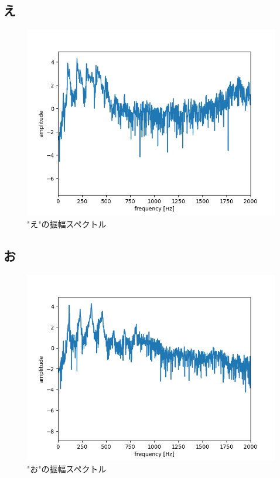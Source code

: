 \documentclass[a4paper,11pt]{jsarticle}
\begin{document}
\subsection*{え}
\begin{figure}[H]
  \centering
  \includegraphics[scale=0.5]{../ex2/img/plot-spectrum-2000_e.png}
  \caption{"え"の振幅スペクトル}
  \label{spectrum_e}
\end{figure}

\subsection*{お}
\begin{figure}[H]
  \centering
  \includegraphics[scale=0.5]{../ex2/img/plot-spectrum-2000_o.png}
  \caption{"お"の振幅スペクトル}
  \label{spectrum_o}
\end{figure}
\end{document}
